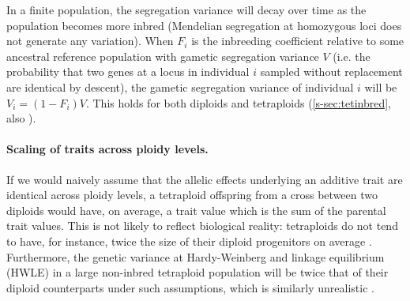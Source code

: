 \documentclass[12pt,a4paper]{article}
\providecommand{\DIFadd}[1]{{\protect\color{blue}\uwave{#1}}} %
\providecommand{\DIFaddbegin}{} %
\providecommand{\DIFaddend}{} %
\begin{document}
    In a finite population, the segregation variance will decay over time as the
    population becomes more inbred (Mendelian segregation at homozygous loci does
    not generate any variation).
    When $F_i$ is the inbreeding coefficient relative to some ancestral reference
    population with gametic segregation variance $V$ (i.e. the probability that two
    genes at a locus in individual $i$ sampled without replacement are identical by
    descent), the gametic segregation variance of individual $i$ will be
    $V_i = (1-F_i)V$.
    This holds for both diploids and tetraploids (\cref{s-sec:tetinbred}, also
    \cite{moody1993}). 

    \paragraph{Scaling of traits across ploidy levels.}

    If we would naively assume that the allelic effects underlying an additive
    trait are identical across ploidy levels, 
    a tetraploid offspring from a cross between two diploids would have, on average,
    a trait value which is the sum of the parental trait values.
    This is not likely to reflect biological reality: tetraploids do not tend to
    have, for instance, twice the size of their diploid progenitors on average
    \DIFaddbegin \DIFadd{(e.g. \mbox{%
\cite{porturas2019}}\hspace{0pt}%
)}\DIFaddend .
    Furthermore, the genetic variance at Hardy-Weinberg and linkage equilibrium
    (HWLE) in a large non-inbred tetraploid population will be twice that of their
    diploid counterparts under such assumptions, which is similarly unrealistic
    \citep{clo2022}.
\end{document}
